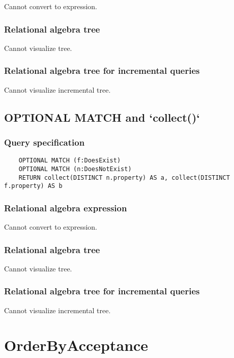 	Cannot convert to expression.

	\subsubsection*{Relational algebra tree}

	Cannot visualize tree.

	\subsubsection*{Relational algebra tree for incremental queries}

	Cannot visualize incremental tree.
	\subsection{OPTIONAL MATCH and `collect()`}

	\subsubsection*{Query specification}

	\begin{lstlisting}
	OPTIONAL MATCH (f:DoesExist)
	OPTIONAL MATCH (n:DoesNotExist)
	RETURN collect(DISTINCT n.property) AS a, collect(DISTINCT f.property) AS b
	\end{lstlisting}


	\subsubsection*{Relational algebra expression}

	Cannot convert to expression.

	\subsubsection*{Relational algebra tree}

	Cannot visualize tree.

	\subsubsection*{Relational algebra tree for incremental queries}

	Cannot visualize incremental tree.

	\section{OrderByAcceptance}

